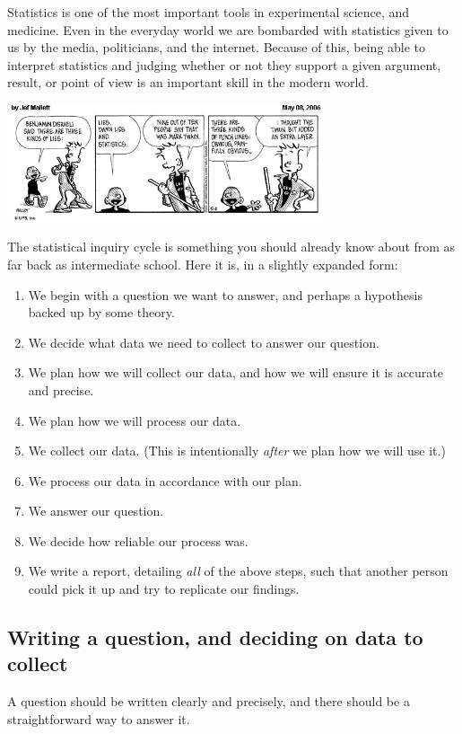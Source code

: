



Statistics is one of the most important tools in experimental science, and medicine. Even in the everyday world we are
bombarded with statistics given to us by the media, politicians, and the internet. Because of this, being able to interpret
statistics and judging whether or not they support a given argument, result, or point of view is an important skill in
the modern world.

\begin{center}
  \includegraphics[width=0.7\textwidth]{stats}
\end{center}

The statistical inquiry cycle is something you should already know about from as far back as intermediate school. Here
it is, in a slightly expanded form:

\begin{enumerate}
  \item We begin with a question we want to answer, and perhaps a hypothesis backed up by some theory.
  \item We decide what data we need to collect to answer our question.
  \item We plan how we will collect our data, and how we will ensure it is accurate and precise.
  \item We plan how we will process our data.
  \item We collect our data. (This is intentionally \emph{after} we plan how we will use it.)
  \item We process our data in accordance with our plan.
  \item We answer our question.
  \item We decide how reliable our process was.
  \item We write a report, detailing \emph{all} of the above steps, such that another person
        could pick it up and try to replicate our findings.
\end{enumerate}

\subsection*{Writing a question, and deciding on data to collect}
A question should be written clearly and precisely, and there should be a straightforward way to answer it.

